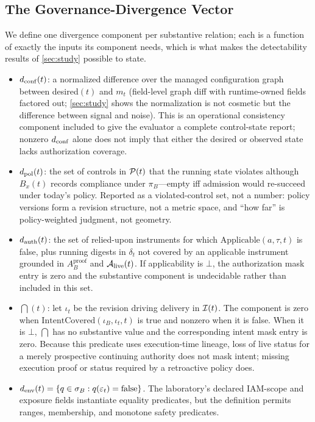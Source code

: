 \subsection{The Governance-Divergence Vector}
\label{sec:model-distance}

We define one divergence component per substantive relation; each is a function of exactly the
inputs its component needs, which is what makes the detectability results of
\cref{sec:study} possible to state.

\begin{itemize}[leftmargin=1.5em,itemsep=1.5pt,topsep=2pt]
\item $d_{\mathrm{conf}}(t)$: a normalized difference over the managed configuration
graph between desired$(t)$ and $m_t$ (field-level graph diff with
runtime-owned fields factored out; \cref{sec:study} shows the normalization
is not cosmetic but the difference between signal and noise). This is an
operational consistency component included to give the evaluator a complete
control-state report; nonzero $d_{\mathrm{conf}}$ alone does not imply that either the
desired or observed state lacks authorization coverage.
\item $d_{\mathrm{pol}}(t)$: the set of controls in $\mathcal{P}(t)$ that the running state
violates although $B_x(t)$ records compliance under $\pi_B$---empty iff admission would
re-succeed under today's policy. Reported as a violated-control set, not a
number: policy versions form a revision structure, not a metric space, and
``how far'' is policy-weighted judgment, not geometry.
\item $d_{\mathrm{auth}}(t)$: the set of relied-upon instruments for which
$\mathrm{Applicable}(a,\tau,t)$ is false, plus running digests in $\delta_t$
not covered by an applicable instrument grounded in $A_B^{\mathrm{proof}}$
and $\mathcal{A}_{\mathrm{live}}(t)$. If applicability is $\bot$, the authorization
mask entry is zero and the substantive component is undecidable rather than
included in this set.
\item $\dint(t)$: let $\iota_t$ be the revision driving delivery in
$\mathcal{I}(t)$. The component is zero when
$\mathrm{IntentCovered}(\iota_B,\iota_t,t)$ is true and nonzero when it is
false. When it is $\bot$, $\dint$ has no substantive value and
the corresponding intent mask entry is zero. Because this predicate uses execution-time lineage,
loss of live status for a merely prospective continuing authority does not
mask intent; missing execution proof or status required by a retroactive
policy does.
\item $d_{\mathrm{env}}(t)=\{q\in\sigma_B:q(\varepsilon_t)=\mathrm{false}\}$. The laboratory's
declared IAM-scope and exposure fields instantiate equality predicates, but
the definition permits ranges, membership, and monotone safety predicates.
\end{itemize}

